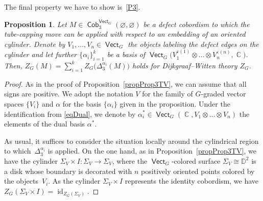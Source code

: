 \documentclass[pdftex]{sigma}
\DeclareMathOperator{\id}{id}
\DeclareMathOperator{\vect}{\mathsf{Vect}}
\DeclareMathOperator{\C}{\mathbb{C}}
\DeclareMathOperator{\Cob}{\mathsf{Cob}}
\numberwithin{equation}{section}
\newtheorem{Proposition}[Proposition]{Proposition}
\theoremstyle{definition}
\begin{document}
The final property we have to show is~\ref{P3}.
\begin{Proposition}\label{propDW3}
Let $M \in \Cob_3^{\vect_G}(\varnothing, \varnothing)$ be a defect cobordism to which the tube-capping move can be applied with respect to an embedding of an oriented cylinder. Denote by $V_1, \dots, V_n \in \vect_G$ the objects labeling the defect edges on the cylinder and let further $\{\alpha_i\}_{i = 1}^k$ be a basis of $\vect_G\bigl(V_1^{\varepsilon(1)} \otimes \dots \otimes V_n^{\varepsilon(n)}, \C\bigr)$. Then, $Z_G(M) = \sum_{i = 1}^{k}Z_G\bigl(\Delta_3^{\alpha_i}(M)\bigr)$ holds for Dijkgraaf--Witten theory $Z_G$.
\end{Proposition}
\begin{proof}
As in the proof of Proposition~\ref{propProp3TV}, we can assume that all signs are positive. We adopt the notation $V$ for the family of $G$-graded vector spaces $\{V_i\}$ and $\alpha$ for the basis $\{\alpha_i\}$ given in the proposition. Under the identification from \eqref{eqDual},
 we denote by $\alpha_i^* \in \vect_G (\C, V_1 \otimes \dots \otimes V_n )$ the elements of the dual basis $\alpha^*$.

 As usual, it suffices to consider the situation locally around the cylindrical region to which~$\Delta_3^{\alpha_i}$ is applied. On the one hand, as in Proposition~\ref{propProp3TV}, we have the cylinder ${\Sigma_V \times I\colon \Sigma_V \rightarrow \Sigma_V}$, where the $\vect_G$-colored surface $\Sigma_V \cong \mathbb{D}^2$ is a disk whose boundary is decorated with $n$ positively oriented points colored by the objects~$V_i$. As the cylinder $\Sigma_V \times I$ represents the identity cobordism, we have $Z_G(\Sigma_V \times I) = \id_{Z_G(\Sigma_V)}$.


\end{proof}
\end{document}
